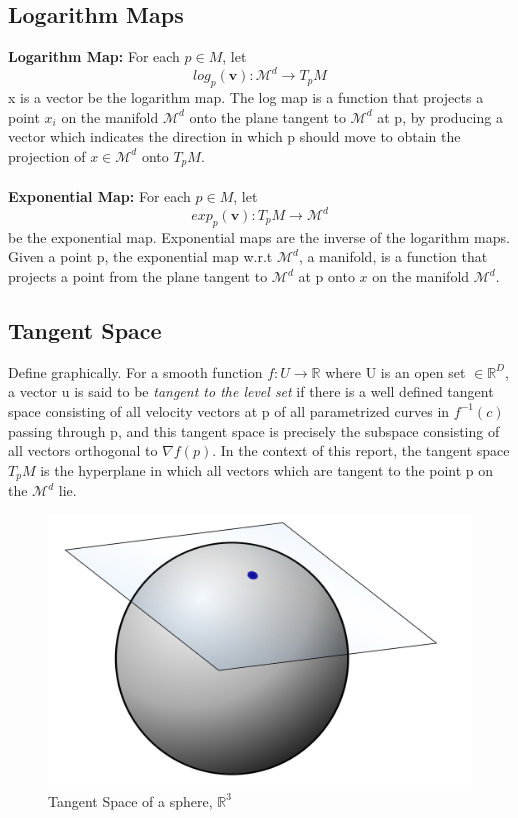 \documentclass[12pt]{report}
\begin{document}
\newpage

\subsection{Logarithm Maps}
\textbf{Logarithm Map:} For each $p \in M$, let
$$log_p(\textbf{v}):\mathcal{M}^d\longrightarrow T_pM$$
x is a vector
be the logarithm map. The log map is a function that projects a point $x_i$ 
on the manifold $\mathcal{M}^d$
onto the plane tangent to $\mathcal{M}^d$ at p, by producing a vector which indicates 
the direction in which p should move to obtain the projection of $x \in \mathcal{M}^d$ onto $T_pM$.\\
\\
\textbf{Exponential Map:} For each $p \in M$, let
$$exp_p(\textbf{v}): T_pM \longrightarrow \mathcal{M}^d$$
be the exponential map. Exponential maps are the inverse of the logarithm maps.
Given a point p, the exponential map w.r.t $\mathcal{M}^d$, a manifold, 
is a function that projects a point from the plane tangent to $\mathcal{M}^d$ at p onto $x$ 
on the manifold $\mathcal{M}^d$.\\

\subsection{Tangent Space}
Define graphically.
For a smooth function $f:U \longrightarrow \mathbb{R}$ 
where U is an open set $\in \mathbb{R}^D$, a vector u is said to be 
\textit{tangent to the level set} if
there is a well defined tangent space consisting of all velocity vectors 
at p of all parametrized curves in $f^{-1}(c)$ passing through p, 
and this tangent space is precisely the subspace consisting of 
all vectors orthogonal to $\nabla f(p)$. In the context of this report, 
the tangent space $T_pM$ is the hyperplane in which all vectors which are tangent to the point 
p on the $\mathcal{M}^d$ lie.
\begin{figure}[h]
    \begin{center}
        \includegraphics[scale=0.1]{tangent_space.png}
        \caption{Tangent Space of a sphere, $\mathbb{R}^3$}
        \label{fig:tanspace}
    \end{center}
\end{figure}
\end{document}
